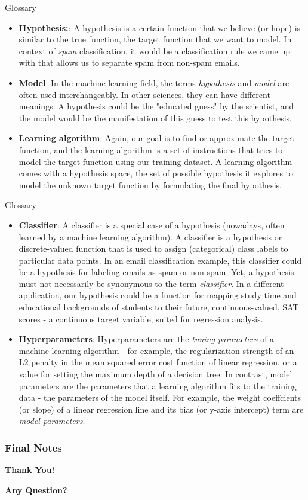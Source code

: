 \documentclass[compress,oilve]{beamer}
\begin{document}
\begin{frame}{Glossary}
\begin{itemize}
\item \textbf{Hypothesis:}: A hypothesis is a certain function that we believe (or hope) is similar to the true function, the target function that we want to model. In context of \textit{spam} classification, it would be a classification rule we came up with that allows us to separate spam from non-spam emails.

\item \textbf{Model}: In the machine learning field, the terms \textit{hypothesis} and \textit{model} are often used interchangeably. In other sciences, they can have different meanings: A hypothesis could be the "educated guess" by the scientist, and the model would be the manifestation of this guess to test this hypothesis.

\item \textbf{Learning algorithm}: Again, our goal is to find or approximate the target function, and the learning algorithm is a set of instructions that tries to model the target function using our training dataset. A learning algorithm comes with a hypothesis space, the set of possible hypothesis it explores to model the unknown target function by formulating the final hypothesis.

\end{itemize}
\end{frame}



\begin{frame}{Glossary}
\begin{itemize}

\item \textbf{Classifier}: A classifier is a special case of a hypothesis (nowadays, often learned by a machine learning algorithm). A classifier is a hypothesis or discrete-valued function that is used to assign (categorical) class labels to particular data points. In an email classification example, this classifier could be a hypothesis for labeling emails as spam or non-spam. Yet, a hypothesis must not necessarily be synonymous to the term \textit{classifier}. In a different application, our hypothesis could be a function for mapping study time and educational backgrounds of students to their future, continuous-valued, SAT scores - a continuous target variable, suited for regression analysis.
\item \textbf{Hyperparameters}: Hyperparameters are the \textit{tuning parameters} of a machine learning algorithm - for example, the regularization strength of an L2 penalty in the mean squared error cost function of linear regression, or a value for setting the maximum depth of a decision tree. In contrast, model parameters are the parameters that a learning algorithm fits to the training data - the parameters of the model itself. For example, the weight coeffcients (or slope) of a linear regression line and its bias (or y-axis intercept) term are \textit{model parameters}.
\end{itemize}
\end{frame}


\frametitle{Final Notes}
\centering
\vspace{50 pt}
\textbf{Thank You!}
\vspace{50pt}

\textbf{Any Question?}
\end{document}
